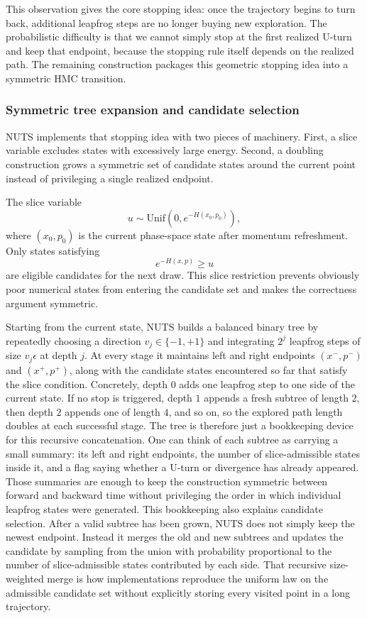 This observation gives the core stopping idea: once the trajectory begins to turn back, additional leapfrog steps are no longer buying new exploration.
The probabilistic difficulty is that we cannot simply stop at the first realized U-turn and keep that endpoint, because the stopping rule itself depends on the realized path.
The remaining construction packages this geometric stopping idea into a symmetric HMC transition.

\subsubsection{Symmetric tree expansion and candidate selection}
\label{subsubsec:nuts-tree}

NUTS implements that stopping idea with two pieces of machinery.
First, a slice variable excludes states with excessively large energy.
Second, a doubling construction grows a symmetric set of candidate states around the current point instead of privileging a single realized endpoint.

The slice variable
\begin{equation}
  u \sim \mathrm{Unif}\!\left(0,e^{-H(x_0,p_0)}\right),
  \label{eq:nuts-slice}
\end{equation}
where $(x_0,p_0)$ is the current phase-space state after momentum refreshment.
Only states satisfying
\[
  e^{-H(x,p)} \ge u
\]
are eligible candidates for the next draw.
This slice restriction prevents obviously poor numerical states from entering the candidate set and makes the correctness argument symmetric.

Starting from the current state, NUTS builds a balanced binary tree by repeatedly choosing a direction $v_j\in\{-1,+1\}$ and integrating $2^j$ leapfrog steps of size $v_j\epsilon$ at depth $j$.
At every stage it maintains left and right endpoints $(x^-,p^-)$ and $(x^+,p^+)$, along with the candidate states encountered so far that satisfy the slice condition.
Concretely, depth \(0\) adds one leapfrog step to one side of the current state.
If no stop is triggered, depth \(1\) appends a fresh subtree of length \(2\), then depth \(2\) appends one of length \(4\), and so on, so the explored path length doubles at each successful stage.
The tree is therefore just a bookkeeping device for this recursive concatenation.
One can think of each subtree as carrying a small summary: its left and right endpoints, the number of slice-admissible states inside it, and a flag saying whether a U-turn or divergence has already appeared.
Those summaries are enough to keep the construction symmetric between forward and backward time without privileging the order in which individual leapfrog states were generated.
This bookkeeping also explains candidate selection.
After a valid subtree has been grown, NUTS does not simply keep the newest endpoint.
Instead it merges the old and new subtrees and updates the candidate by sampling from the union with probability proportional to the number of slice-admissible states contributed by each side.
That recursive size-weighted merge is how implementations reproduce the uniform law on the admissible candidate set without explicitly storing every visited point in a long trajectory.

